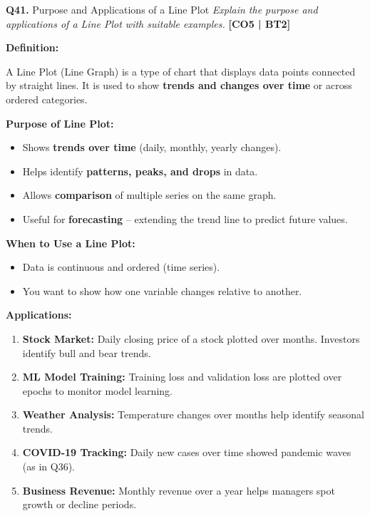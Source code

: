 \documentclass[12pt,a4paper]{article}
\newcommand{\Qno}[1]{\textbf{\color{darkred}Q#1.}}
\newcommand{\term}[1]{\textbf{\color{headingcolor}#1}}
\begin{document}
\vspace{8pt}

\begin{questionbox}{\Qno{41} Purpose and Applications of a Line Plot}
\textit{Explain the purpose and applications of a Line Plot with suitable examples.} \hfill \textbf{[CO5 | BT2]}
\end{questionbox}

\begin{answerenv}

\textbf{\color{headingcolor}Definition:}

A Line Plot (Line Graph) is a type of chart that displays data points connected by straight lines. It is used to show \textbf{trends and changes over time} or across ordered categories.

\vspace{6pt}
\textbf{\color{headingcolor}Purpose of Line Plot:}
\begin{itemize}[leftmargin=1.5em, itemsep=3pt]
  \item Shows \term{trends over time} (daily, monthly, yearly changes).
  \item Helps identify \term{patterns, peaks, and drops} in data.
  \item Allows \term{comparison} of multiple series on the same graph.
  \item Useful for \term{forecasting} -- extending the trend line to predict future values.
\end{itemize}

\vspace{6pt}
\textbf{\color{headingcolor}When to Use a Line Plot:}
\begin{itemize}[leftmargin=1.5em]
  \item Data is continuous and ordered (time series).
  \item You want to show how one variable changes relative to another.
\end{itemize}

\vspace{6pt}
\textbf{\color{headingcolor}Applications:}
\begin{enumerate}[leftmargin=1.8em, itemsep=4pt]
  \item \term{Stock Market:} Daily closing price of a stock plotted over months. Investors identify bull and bear trends.
  \item \term{ML Model Training:} Training loss and validation loss are plotted over epochs to monitor model learning.
  \item \term{Weather Analysis:} Temperature changes over months help identify seasonal trends.
  \item \term{COVID-19 Tracking:} Daily new cases over time showed pandemic waves (as in Q36).
  \item \term{Business Revenue:} Monthly revenue over a year helps managers spot growth or decline periods.
\end{enumerate}


\end{answerenv}
\end{document}
